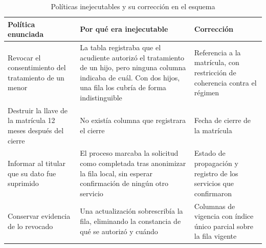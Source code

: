 \iffalse %
\begin{table}[htbp]
\centering
\caption{Políticas inejecutables y su corrección en el esquema}
\label{tab:politicas}
\small
\begin{tabular}{@{}p{4.3cm}p{5.0cm}p{4.4cm}@{}}
\toprule
\textbf{Política enunciada} & \textbf{Por qué era inejecutable} & \textbf{Corrección} \\
\midrule
Revocar el consentimiento del tratamiento de un menor &
La tabla registraba que el acudiente autorizó el tratamiento de un hijo, pero ninguna
columna indicaba de cuál. Con dos hijos, una fila los cubría de forma indistinguible &
Referencia a la matrícula, con restricción de coherencia contra el régimen \\
\addlinespace
Destruir la llave de la matrícula 12 meses después del cierre &
No existía columna que registrara el cierre &
Fecha de cierre de la matrícula \\
\addlinespace
Informar al titular que su dato fue suprimido &
El proceso marcaba la solicitud como completada tras anonimizar la fila local, sin esperar
confirmación de ningún otro servicio &
Estado de propagación y registro de los servicios que confirmaron \\
\addlinespace
Conservar evidencia de lo revocado &
Una actualización sobrescribía la fila, eliminando la constancia de qué se autorizó y
cuándo &
Columnas de vigencia con índice único parcial sobre la fila vigente \\
\bottomrule
\end{tabular}
\end{table}
